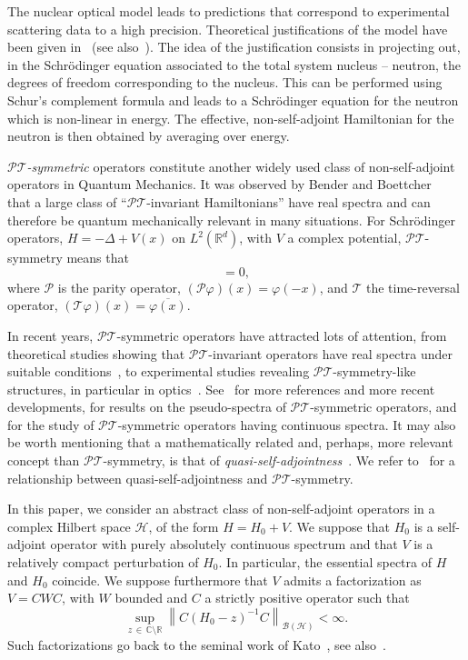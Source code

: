 \documentclass[10pt]{amsart}
\theoremstyle{definition}\newtheorem{defi}[theo]{Definition}\newtheorem{rema}[theo]{Remark}\newtheorem{exam}[theo]{Example}\newtheorem{exem}[theo]{Example}\newtheorem{nota}[theo]{Notation}
\newcommand{\Hi}{\mathcal{H}}
\newcommand{\bbC}{\mathbb{C}}
\newcommand{\R}{\mathbb{R}}
\newcommand{\clPT}{\mathcal{PT}}
\newcommand{\clP}{\mathcal{P}}
\newcommand{\clT}{\mathcal{T}}
\newcommand{\clB}{\mathcal{B}}
\begin{document}
The nuclear optical model leads to predictions that correspond to experimental scattering data to a high precision. Theoretical justifications of the model have been given in~\cite{Fe58_02,Fe58_01,Fe62_01} (see also~\cite{Ba15_01,Fe92_01,Ho71_01}). The idea of the justification consists in projecting out, in the Schr\"odinger equation associated to the total system nucleus -- neutron, the degrees of freedom corresponding to the nucleus. This can be performed using Schur's complement formula and leads to a Schr\"odinger equation for the neutron which is non-linear in energy. The effective, non-self-adjoint Hamiltonian for the neutron is then obtained by averaging over energy.

\emph{$\clPT$-symmetric} operators constitute another widely used class of non-self-adjoint operators in Quantum Mechanics. It was observed by Bender and Boettcher~\cite{BeBo98_01} that a large class of ``$\clPT$-invariant Hamiltonians'' have real spectra and can therefore be quantum mechanically relevant in many situations. For Schr\"odinger operators, $H=-\Delta+V(x)$ on $L^2(\R^d)$, with $V$ a complex potential, $\clPT$-symmetry means that
\begin{equation*}
[H, \clPT]= 0,
\end{equation*}
where $\clP$ is the parity operator, $(\clP\varphi)(x)=\varphi(-x)$, and $\clT$ the time-reversal operator, $(\clT\varphi)(x)=\overline{\varphi(x)}$.

In recent years, $\clPT$-symmetric operators have attracted lots of attention, from theoretical studies showing that $\clPT$-invariant operators have real spectra under suitable conditions~\cite{DoDuTa01_01,KrBiZn06_01,
Kr08_01,KrSiTaVi15_01,Mo02_01,Sh02_01}, to experimental studies revealing $\clPT$-symmetry-like structures, in particular in optics~\cite{Lo09_01,Re12_01,Ru10_01}. See~\cite{El18_01} for more references and more recent developments, \cite{KrSiTaVi15_01} for results on the pseudo-spectra of $\clPT$-symmetric operators, and~\cite{BoKr08_01,BoKr12_01,WeBe20_01} for the study of $\clPT$-symmetric operators having continuous spectra. It may also be worth mentioning that a mathematically related and, perhaps, more relevant concept than $\clPT$-symmetry, is that of \emph{quasi-self-adjointness}~\cite{Di61_01,ScGeHa92_01}. We refer to~\cite{KrSiTaVi15_01} for a relationship between quasi-self-adjointness and $\clPT$-symmetry.

In this paper, we consider an abstract class of non-self-adjoint operators in a complex Hilbert space $\Hi$, of the form $H=H_0+V$. We suppose that $H_0$ is a self-adjoint operator with purely absolutely continuous spectrum and that $V$ is a relatively compact perturbation of $H_0$. In particular, the essential spectra of $H$ and $H_0$ coincide. We suppose furthermore that $V$ admits a factorization as $V=CWC$, with $W$ bounded and $C$ a strictly positive operator such that
\begin{equation*}
\sup_{z\,\in\,\bbC\setminus\R}\left\|C(H_0-z)^{-1}C\right\|_{\clB(\Hi)}<\infty.
\end{equation*}
Such factorizations go back to the seminal work of Kato~\cite{Ka65_01}, see also~\cite{KoKu66_01}.
\end{document}
